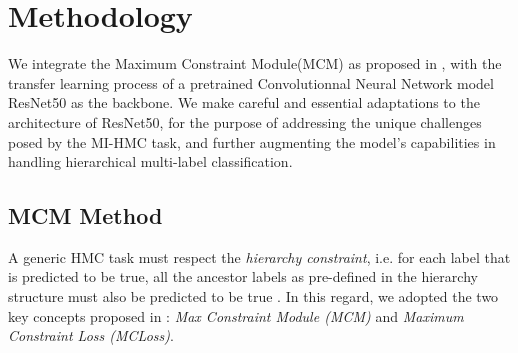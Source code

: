 \documentclass[wcp]{jmlr}
\begin{document}
\section{Methodology}

 We integrate the Maximum Constraint Module(MCM) as proposed in \cite{Giunchiglia01}, with the transfer learning process of a pretrained Convolutionnal Neural Network model ResNet50 \cite{He02} as the backbone. We make careful and essential adaptations to the architecture of ResNet50, for the purpose of addressing the unique challenges posed by the MI-HMC task, and further augmenting the model's capabilities in handling hierarchical multi-label classification.

\subsection{MCM Method}\label{sec:mcm}

A generic HMC task %
 must respect the \textit{hierarchy constraint}, i.e. for each label that is predicted to be true, all the ancestor labels as pre-defined in the hierarchy structure must also be predicted to be true \cite{Giunchiglia01}. %
In this regard, we adopted the two key concepts proposed in  \cite{Giunchiglia01}: \textit{Max Constraint Module (MCM)} and  \textit{Maximum Constraint Loss (MCLoss)}.
\end{document}
